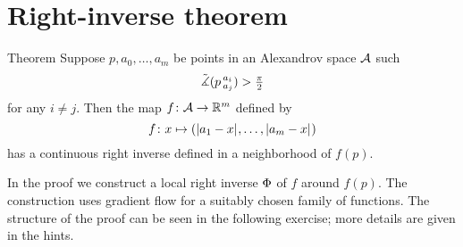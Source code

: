\section{Right-inverse theorem}

\begin{thm}{Theorem}\label{thm:right-inverse}
Suppose $p,a_0,\dots,a_m$ be points in an Alexandrov space $\mathcal{A}$ such
\[\tilde\measuredangle(p\,{}^{a_i}_{a_j})>\tfrac\pi2\]
for any $i\ne j$.
Then the map $f\colon\mathcal{A}\to\mathbb{R}^m$ defined by
\[f\colon x\mapsto (|{a_1}-{x}|_{}^{{}},\dots,|{a_m}-{x}|_{}^{{}})\]
has a  continuous right inverse defined in a neighborhood of $f(p)$.
\end{thm}

In the proof we construct a local right inverse $\Phi$ of $f$ around $f(p)$.
The construction uses gradient flow for a suitably chosen family of functions.
The structure of the proof can be seen in the following exercise;
more details are given in the hints.

